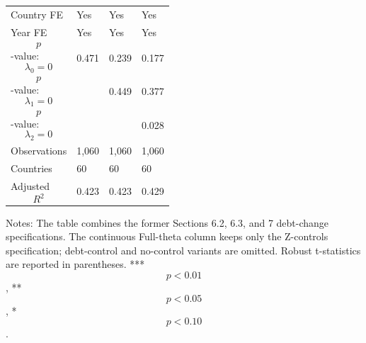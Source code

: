 \begin{table}[H]
\begin{threeparttable}
\begin{tabularx}{\textwidth}{lYYY}
Country FE & Yes & Yes & Yes \\
Year FE & Yes & Yes & Yes \\
$$p$$-value: $$\lambda_0=0$$ & 0.471 & 0.239 & 0.177 \\
$$p$$-value: $$\lambda_1=0$$ &  & 0.449 & 0.377 \\
$$p$$-value: $$\lambda_2=0$$ &  &  & 0.028 \\
Observations & 1,060 & 1,060 & 1,060 \\
Countries & 60 & 60 & 60 \\
Adjusted $$R^2$$ & 0.423 & 0.423 & 0.429 \\
\bottomrule
\end{tabularx}
\begin{tablenotes}[flushleft]\footnotesize
\item Notes: The table combines the former Sections 6.2, 6.3, and 7 debt-change specifications. The continuous Full-theta column keeps only the Z-controls specification; debt-control and no-control variants are omitted. Robust t-statistics are reported in parentheses. *** $$p<0.01$$, ** $$p<0.05$$, * $$p<0.10$$.
\end{tablenotes}
\end{threeparttable}
\end{table}
